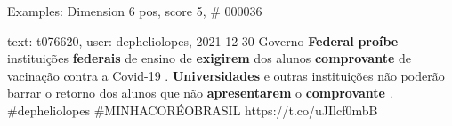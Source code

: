 \begin{frame}{Examples: Dimension 6 pos, score 5, \# 000036}
\footnotesize
\begin{exampleblock}{text: t076620, user: depheliolopes, 2021-12-30}
Governo \textbf{Federal} \textbf{proíbe} instituições \textbf{federais} de 
ensino de \textbf{exigirem} dos alunos \textbf{comprovante} de vacinação contra 
a Covid-19 . \textbf{Universidades} e outras instituições não poderão barrar o 
retorno dos alunos que não \textbf{apresentarem} o \textbf{comprovante} . 
\#depheliolopes \#MINHACORÉOBRASIL https://t.co/uJIlcf0mbB 
\end{exampleblock}
\end{frame}
